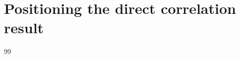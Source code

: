 \documentclass[11pt,oneside]{book}
\theoremstyle{definition}
\theoremstyle{remark}
\begin{document}
\chapter{Positioning the direct correlation result}




\backmatter
\begin{thebibliography}{99}










\end{thebibliography}
\end{document}
